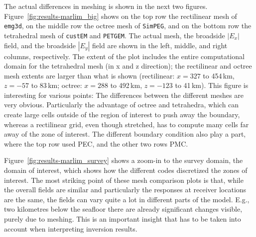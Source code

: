 \documentclass[
    paper,
  ]{geophysics}
\newcommand{\emg}[2]{\texttt{emg#1#2}\xspace}
\newcommand{\simpeg}{\texttt{SimPEG}\xspace}
\newcommand{\custem}{\texttt{custEM}\xspace}
\newcommand{\petgem}{\texttt{PETGEM}\xspace}
\begin{document}
The actual differences in meshing is shown in the next two figures. Figure~\ref{fig:results-marlim_big} shows on the top row the rectilinear mesh of \emg3d, on the middle row the octree mesh of \simpeg, and on the bottom row the tetrahedral mesh of \custem and \petgem. The actual mesh, the broadside $|E_x|$ field, and the broadside $|E_y|$ field are shown in the left, middle, and right columns, respectively. The extent of the plot includes the entire computational domain for the tetrahedral mesh (in x and z direction); the rectilinear and octree mesh extents are larger than what is shown (rectilinear: $x=327$ to 454\,km, $z=-57$ to 83\,km; octree: $x=288$ to 492\,km, $z=-123$ to 41\,km).
%
%
This figure is interesting for various points: The differences between the different meshes are very obvious. Particularly the advantage of octree and tetrahedra, which can create large cells outside of the region of interest to push away the boundary, whereas a rectilinear grid, even though stretched, has to compute many cells far away of the zone of interest. The different boundary condition also play a part, where the top row used PEC, and the other two rows PMC.

Figure~\ref{fig:results-marlim_survey} shows a zoom-in to the survey domain, the domain of interest, which shows how the different codes discretized the zones of interest.
%
%
The most striking point of these mesh comparison plots is that, while the overall fields are similar and particularly the responses at receiver locations are the same, the fields can vary quite a lot in different parts of the model. E.g., two kilometres below the seafloor there are already significant changes visible, purely due to meshing. This is an important insight that has to be taken into account when interpreting inversion results.
\end{document}
